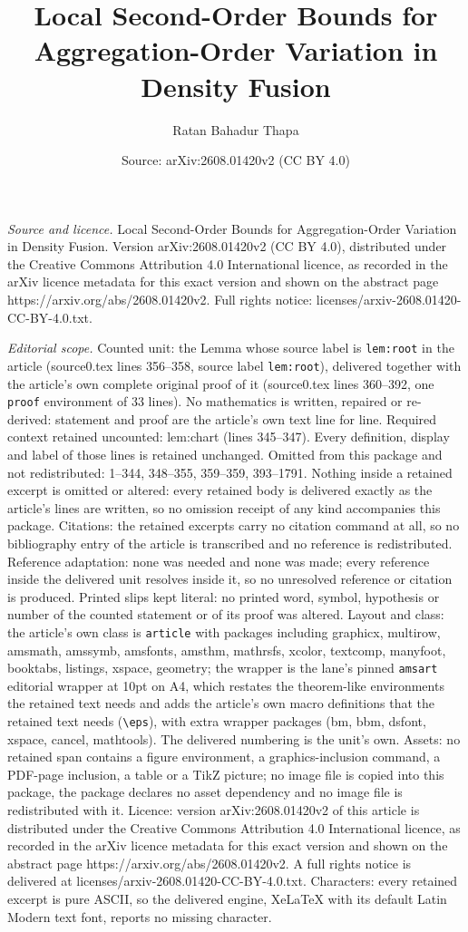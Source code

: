 \documentclass[10pt,a4paper]{amsart}
\title[Local Second-Order Bounds for Aggregation-Order Variation in]{Local Second-Order Bounds for Aggregation-Order Variation in Density Fusion}
\author{Ratan Bahadur Thapa}
\date{Source: arXiv:2608.01420v2 (CC BY 4.0)}
\begin{document}
\maketitle

\noindent\emph{Source and licence.} Local Second-Order Bounds for Aggregation-Order Variation in Density Fusion. Version arXiv:2608.01420v2 (CC BY 4.0), distributed under the Creative Commons Attribution 4.0 International licence, as recorded in the arXiv licence metadata for this exact version and shown on the abstract page https://arxiv.org/abs/2608.01420v2. Full rights notice: licenses/arxiv-2608.01420-CC-BY-4.0.txt.\par\smallskip

\noindent\textit{Editorial scope.} Counted unit: the Lemma whose source label is \texttt{lem:root} in the article (source0.tex lines 356--358, source label \texttt{lem:root}), delivered together with the article's own complete original proof of it (source0.tex lines 360--392, one \texttt{proof} environment of 33 lines). No mathematics is written, repaired or re-derived: statement and proof are the article's own text line for line. Required context retained uncounted: lem:chart (lines 345--347). Every definition, display and label of those lines is retained unchanged. Omitted from this package and not redistributed: 1--344, 348--355, 359--359, 393--1791. Nothing inside a retained excerpt is omitted or altered: every retained body is delivered exactly as the article's lines are written, so no omission receipt of any kind accompanies this package. Citations: the retained excerpts carry no citation command at all, so no bibliography entry of the article is transcribed and no reference is redistributed. Reference adaptation: none was needed and none was made; every reference inside the delivered unit resolves inside it, so no unresolved reference or citation is produced. Printed slips kept literal: no printed word, symbol, hypothesis or number of the counted statement or of its proof was altered. Layout and class: the article's own class is \texttt{article} with packages including graphicx, multirow, amsmath, amssymb, amsfonts, amsthm, mathrsfs, xcolor, textcomp, manyfoot, booktabs, listings, xspace, geometry; the wrapper is the lane's pinned \texttt{amsart} editorial wrapper at 10pt on A4, which restates the theorem-like environments the retained text needs and adds the article's own macro definitions that the retained text needs (\texttt{\textbackslash eps}), with extra wrapper packages (bm, bbm, dsfont, xspace, cancel, mathtools). The delivered numbering is the unit's own. Assets: no retained span contains a figure environment, a graphics-inclusion command, a PDF-page inclusion, a table or a TikZ picture; no image file is copied into this package, the package declares no asset dependency and no image file is redistributed with it. Licence: version arXiv:2608.01420v2 of this article is distributed under the Creative Commons Attribution 4.0 International licence, as recorded in the arXiv licence metadata for this exact version and shown on the abstract page https://arxiv.org/abs/2608.01420v2. A full rights notice is delivered at licenses/arxiv-2608.01420-CC-BY-4.0.txt. Characters: every retained excerpt is pure ASCII, so the delivered engine, XeLaTeX with its default Latin Modern text font, reports no missing character.
\end{document}
